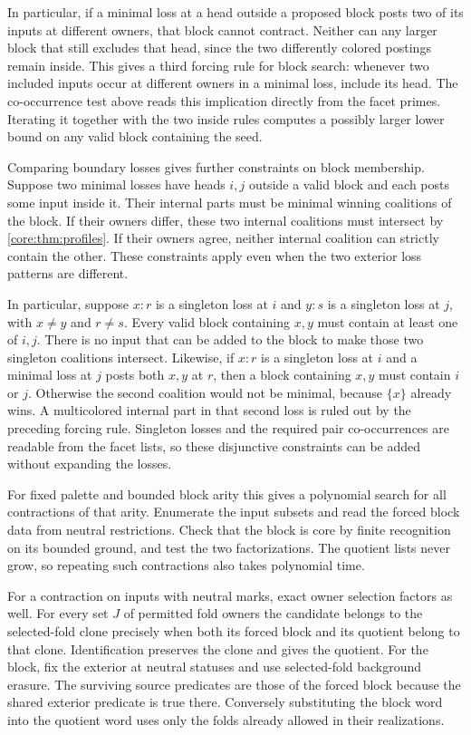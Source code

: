 In particular, if a minimal loss at a head outside
a proposed block posts two of its inputs at different
owners, that block cannot contract. Neither can any
larger block that still excludes that head, since
the two differently colored postings remain inside.
This gives a third forcing rule for block search:
whenever two included inputs occur at different
owners in a minimal loss, include its head. The
co-occurrence test above reads this implication
directly from the facet primes. Iterating it together
with the two inside rules computes a possibly
larger lower bound on any valid block containing
the seed.

Comparing boundary losses gives further constraints on
block membership. Suppose two minimal losses have
heads $i,j$ outside a valid block and each posts some
input inside it. Their internal parts must be minimal
winning coalitions of the block. If their owners
differ, these two internal coalitions must intersect
by \cref{core:thm:profiles}. If their owners agree,
neither internal coalition can strictly contain the
other. These constraints apply even when the two
exterior loss patterns are different.

In particular, suppose $x{:}r$ is a singleton loss
at $i$ and $y{:}s$ is a singleton loss at $j$, with
$x\ne y$ and $r\ne s$. Every valid block containing
$x,y$ must contain at least one of $i,j$. There is
no input that can be added to the block to make those
two singleton coalitions intersect. Likewise, if
$x{:}r$ is a singleton loss at $i$ and a minimal
loss at $j$ posts both $x,y$ at $r$, then a block
containing $x,y$ must contain $i$ or $j$. Otherwise
the second coalition would not be minimal, because
$\{x\}$ already wins. A multicolored internal part
in that second loss is ruled out by the preceding
forcing rule. Singleton losses and the required
pair co-occurrences are readable from the facet
lists, so these disjunctive constraints can be added
without expanding the losses.

For fixed palette and bounded block arity this gives
a polynomial search for all contractions of that
arity. Enumerate the input subsets and read the
forced block data from neutral restrictions. Check
that the block is core by finite recognition on its
bounded ground, and test the two factorizations.
The quotient lists never grow, so repeating such
contractions also takes polynomial time.

For a contraction on inputs with neutral marks,
exact owner selection factors as well. For every
set $J$ of permitted fold owners the candidate
belongs to the selected-fold clone precisely when
both its forced block and its quotient belong to
that clone. Identification preserves the clone and
gives the quotient. For the block, fix the exterior
at neutral statuses and use selected-fold background
erasure. The surviving source predicates are those
of the forced block because the shared exterior
predicate is true there. Conversely substituting
the block word into the quotient word uses only the
folds already allowed in their realizations.


